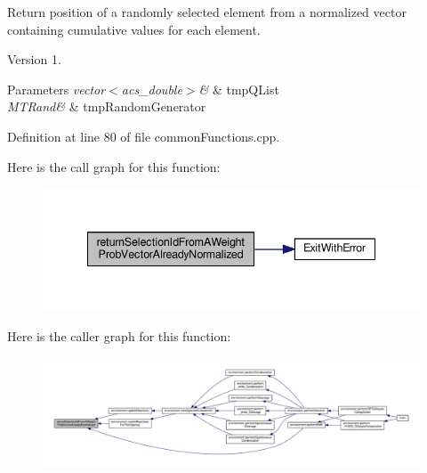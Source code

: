Return position of a randomly selected element from a normalized vector containing cumulative values for each element. 

\begin{DoxyVersion}{Version}
1. 
\end{DoxyVersion}

\begin{DoxyParams}{Parameters}
{\em vector$<$acs\-\_\-double$>$\&} & tmp\-Q\-List \\
\hline
{\em M\-T\-Rand\&} & tmp\-Random\-Generator \\
\hline
\end{DoxyParams}


Definition at line 80 of file common\-Functions.\-cpp.



Here is the call graph for this function\-:\nopagebreak
\begin{figure}[H]
\begin{center}
\leavevmode
\includegraphics[width=338pt]{a00027_a4135ff15fd24eb8fbfee3d00e1cfbf20_cgraph}
\end{center}
\end{figure}




Here is the caller graph for this function\-:\nopagebreak
\begin{figure}[H]
\begin{center}
\leavevmode
\includegraphics[width=350pt]{a00027_a4135ff15fd24eb8fbfee3d00e1cfbf20_icgraph}
\end{center}
\end{figure}


